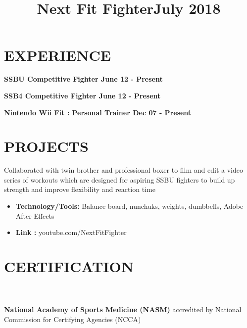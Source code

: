 \documentclass[margin]{res}
\begin{document}
\begin{resume}
\section{EXPERIENCE}

\textbf{SSBU Competitive Fighter \hfill{June 12 - Present}\\}

\textbf{SSB4 Competitive Fighter \hfill{June 12 - Present}\\}

\textbf{Nintendo Wii Fit : Personal Trainer \hfill{Dec 07 - Present }\\}

\section{PROJECTS}
\title{\textbf{Next Fit Fighter\hfill July 2018}
 }
\begin{position}
Collaborated with twin brother and professional boxer to film and edit a video series of workouts which are designed for aspiring SSBU fighters to build up strength and improve flexibility and reaction time
\begin{itemize}
\item \textbf{Technology/Tools:} Balance board, nunchuks, weights, dumbbells, Adobe After Effects
\end{itemize}
\begin{itemize}
\item \textbf{Link :} youtube.com/NextFitFighter
\end{itemize}
\end{position}

\section{CERTIFICATION}
\par
{}
\\
\\
\textbullet{} \textbf{National Academy of Sports Medicine (NASM)} accredited by National Commission for Certifying Agencies (NCCA)
\\


\end{resume}
\end{document}
